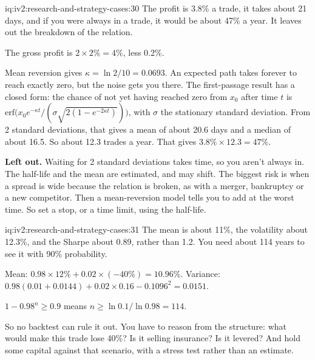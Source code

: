 \begin{solution}{iq:iv2:research-and-strategy-cases:30}
The profit is 3.8\% a trade, it takes about 21 days, and if you were always in a trade, it would be about 47\% a year. It leaves out the breakdown of the relation.

The gross profit is $2 \times 2\% = 4\%$, less 0.2\%.

Mean reversion gives $\kappa = \ln 2/10 = 0.0693$. An expected path takes forever to reach exactly zero, but the noise gets you there. The first-passage result has a closed form: the chance of not yet having reached zero from $x_0$ after time $t$ is $\mathrm{erf}\bigl(x_0 e^{-\kappa t}/(\sigma\sqrt{2(1 - e^{-2\kappa t})})\bigr)$, with $\sigma$ the stationary standard deviation. From 2 standard deviations, that gives a mean of about 20.6 days and a median of about 16.5. So about 12.3 trades a year. That gives $3.8\% \times 12.3 = 47\%$.

\textbf{Left out.} Waiting for 2 standard deviations takes time, so you aren't always in. The half-life and the mean are estimated, and may shift. The biggest risk is when a spread is wide because the relation is broken, as with a merger, bankruptcy or a new competitor. Then a mean-reversion model tells you to add at the worst time. So set a stop, or a time limit, using the half-life.

\end{solution}

\begin{solution}{iq:iv2:research-and-strategy-cases:31}
The mean is about 11\%, the volatility about 12.3\%, and the Sharpe about 0.89, rather than 1.2. You need about 114 years to see it with 90\% probability.

Mean: $0.98 \times 12\% + 0.02 \times (-40\%) = 10.96\%$. Variance: $0.98(0.01 + 0.0144) + 0.02 \times 0.16 - 0.1096^2 = 0.0151$.

$1 - 0.98^n \ge 0.9$ means $n \ge \ln 0.1/\ln 0.98 = 114$.

So no backtest can rule it out. You have to reason from the structure: what would make this trade lose 40\%? Is it selling insurance? Is it levered? And hold some capital against that scenario, with a stress test rather than an estimate.

\end{solution}

